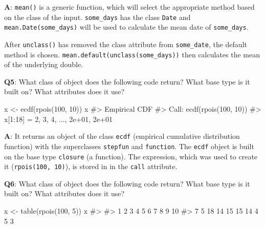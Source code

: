 \documentclass[
]{krantz}
\makeatletter
\newenvironment{Shaded}{\begin{snugshade}}{\end{snugshade}}
\newcommand{\CommentTok}[1]{\textcolor[rgb]{0.56,0.35,0.01}{\textit{#1}}}
\newcommand{\DecValTok}[1]{\textcolor[rgb]{0.00,0.00,0.81}{#1}}
\newcommand{\KeywordTok}[1]{\textcolor[rgb]{0.13,0.29,0.53}{\textbf{#1}}}
\newcommand{\NormalTok}[1]{#1}
\newcommand{\StringTok}[1]{\textcolor[rgb]{0.31,0.60,0.02}{#1}}
\newenvironment{kframe}{%
\medskip{}
\setlength{\fboxsep}{.8em}
 \def\at@end@of@kframe{}%
 \ifinner\ifhmode%
  \def\at@end@of@kframe{\end{minipage}}%
  \begin{minipage}{\columnwidth}%
 \fi\fi%
 \def\FrameCommand##1{\hskip\@totalleftmargin \hskip-\fboxsep
 \colorbox{shadecolor}{##1}\hskip-\fboxsep
     \hskip-\linewidth \hskip-\@totalleftmargin \hskip\columnwidth}%
 \MakeFramed {\advance\hsize-\width
   \@totalleftmargin\z@ \linewidth\hsize
   \@setminipage}}%
 {\par\unskip\endMakeFramed%
 \at@end@of@kframe}
\renewenvironment{Shaded}{\begin{kframe}}{\end{kframe}}
\renewcommand{\KeywordTok} [1]{\textcolor[rgb]{0.00,0.44,0.13}{{#1}}}
\renewcommand{\DecValTok}  [1]{\textcolor[rgb]{0.25,0.63,0.44}{{#1}}}
\renewcommand{\StringTok}  [1]{\textcolor[rgb]{0.25,0.44,0.63}{{#1}}}
\renewcommand{\CommentTok} [1]{\textcolor[rgb]{0.38,0.63,0.69}{{#1}}}
\renewcommand{\NormalTok}  [1]{{#1}}
\makeatother
\begin{document}
\textbf{{A}}: \texttt{mean()} is a generic function, which will select the appropriate method based on the class of the input. \texttt{some\_days} has the class \texttt{Date} and \texttt{mean.Date(some\_days)} will be used to calculate the mean date of \texttt{some\_days}.

After \texttt{unclass()} has removed the class attribute from \texttt{some\_date}, the default method is chosen. \texttt{mean.default(unclass(some\_days))} then calculates the mean of the underlying double.

\textbf{{Q5}}: What class of object does the following code return? What base type is it built on? What attributes does it use?

\begin{Shaded}
\begin{Highlighting}[]
\NormalTok{x <-}\StringTok{ }\KeywordTok{ecdf}\NormalTok{(}\KeywordTok{rpois}\NormalTok{(}\DecValTok{100}\NormalTok{, }\DecValTok{10}\NormalTok{))}
\NormalTok{x}
\CommentTok{#> Empirical CDF }
\CommentTok{#> Call: ecdf(rpois(100, 10))}
\CommentTok{#>  x[1:18] =  2,  3,  4,  ..., 2e+01, 2e+01}
\end{Highlighting}
\end{Shaded}

\textbf{{A}}: It returns an object of the class \texttt{ecdf} (empirical cumulative distribution function) with the superclasses \texttt{stepfun} and \texttt{function}. The \texttt{ecdf} object is built on the base type \texttt{closure} (a function). The expression, which was used to create it (\texttt{rpois(100,\ 10)}), is stored in in the \texttt{call} attribute.

\begin{Shaded}
\end{Shaded}

\textbf{{Q6}}: What class of object does the following code return? What base type is it built on? What attributes does it use?

\begin{Shaded}
\begin{Highlighting}[]
\NormalTok{x <-}\StringTok{ }\KeywordTok{table}\NormalTok{(}\KeywordTok{rpois}\NormalTok{(}\DecValTok{100}\NormalTok{, }\DecValTok{5}\NormalTok{))}
\NormalTok{x}
\CommentTok{#> }
\CommentTok{#>  1  2  3  4  5  6  7  8  9 10 }
\CommentTok{#>  7  5 18 14 15 15 14  4  5  3}
\end{Highlighting}
\end{Shaded}
\end{document}
